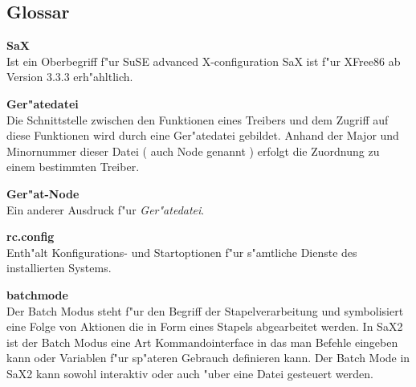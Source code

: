 \begin{twocolumn}
\setcounter{secnumdepth}{-1}
\chapter{Glossar}

\begin{description}

\begin{small}
\item {\textbf{SaX}\\} {
  Ist ein Oberbegriff f"ur SuSE advanced X-configuration
  SaX ist f"ur XFree86 ab Version 3.3.3 erh"ahltlich.
}

\item {\textbf{Ger"atedatei}\\} {
  Die Schnittstelle zwischen den Funktionen eines Treibers
  und dem Zugriff auf diese \linebreak Funktionen wird durch eine
  Ger"atedatei gebildet. Anhand der Major und Minornummer
  dieser Datei ( auch Node genannt ) erfolgt die Zuordnung 
  zu einem bestimmten Treiber. 
}

\item {\textbf{Ger"at-Node}\\} {
  Ein anderer Ausdruck f"ur \textit{Ger"atedatei}.
}

\item {\textbf{rc.config}\\} {
  Enth"alt Konfigurations- und Startoptionen f"ur s"amtliche Dienste
  des installierten Systems. 
}

\item {\textbf{batchmode}\\} {
  Der Batch Modus steht f"ur den Begriff der Stapelverarbeitung 
  und symbolisiert eine Folge von Aktionen die in Form eines
  Stapels abgearbeitet werden. In SaX2 ist der Batch Modus eine
  Art Kommandointerface in das man Befehle eingeben kann oder 
  Variablen f"ur sp"ateren Gebrauch definieren kann. Der Batch 
  Mode in SaX2 kann sowohl interaktiv oder auch "uber eine Datei
  gesteuert werden. 
}

\end{small}
\end{description}
\end{twocolumn}


\onecolumn

